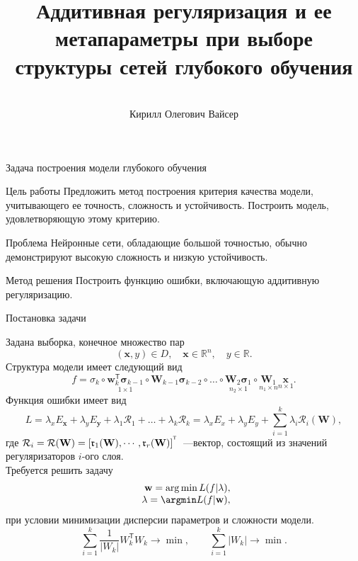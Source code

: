 \documentclass[9pt,pdf,hyperref={unicode}]{beamer}
\title[\hbox to 56mm{Аддитивная регуляризация  \hfill\insertframenumber\,/\,\inserttotalframenumber}]
{Аддитивная регуляризация и ее метапараметры при выборе структуры сетей глубокого обучения}
\author[К.\,О. Вайсер ]{\large \\Кирилл Олегович Вайсер}
\institute{\large
Московский физико-технический институт}
\date{\footnotesize{\emph{Курс:} Численные методы обучения по прецедентам\par (практика, В.\,В. Стрижов)/Группа 774, весна 2020}\\\footnotesize{\emph{Консультант:} аспирант М.\ С. Потанин}\\
\footnotesize{\emph{Научный руководитель:} д.ф.-м.н. В.\ В. Стрижов}}
\newcommand{\rk}{\mathfrak{r}}
\newcommand{\sigmab}{{\boldsymbol{\sigma}}}
\newcommand{\T}{^{\text{\tiny\sffamily\upshape\mdseries T}}}
\newcommand{\x}{{\mathbf{x}}}
\newcommand{\y}{{\mathbf{y}}}
\newcommand{\w}{{\mathbf{W}}}
\newcommand{\wm}{{\mathbf{w}}}
\begin{document}
\begin{frame}
\titlepage
\end{frame}
\begin{frame}{Задача построения модели глубокого обучения}
\begin{block}{Цель работы}
Предложить метод построения критерия качества модели, учитывающего ее точность, сложность и устойчивость. Построить модель, удовлетворяющую этому критерию. 
\end{block}
\begin{block}{Проблема}
Нейронные сети, обладающие большой точностью, обычно демонстрируют высокую сложность и низкую устойчивость.
\end{block}
\begin{block}{Метод решения}
Построить функцию ошибки, включающую аддитивную регуляризацию.
\end{block}
\end{frame}
\begin{frame}{Постановка задачи}

Задана выборка, конечное множество пар  $$
(\mathbf{x},y) \in D,\quad \mathbf{x} \in \mathbb{R}^{n},\quad y\in \mathbb{R}.
$$
Структура модели имеет следующий вид
\begin{equation}
f = \sigma_k\circ\underset{1\times1}{\wm_k^\mathsf{T}\sigmab_{k-1}}\circ\w_{k-1}\sigmab_{k-2}\circ\dots\circ\underset{n_2 \times 1}{\w_2\sigmab_1}\circ\underset{n_1 \times n}{\w_1}\underset{n \times 1}{\x}.
\end{equation}
Функция ошибки имеет вид
\begin{equation}
L = \lambda_xE_{\mathbf{x}} + \lambda_yE_{\y} + \lambda_1\mathcal{R}_1+\dots+\lambda_k\mathcal{R}_k = \lambda_xE_x + \lambda_yE_y + \sum\limits_{i = 1}^k\mathbb{\lambda}_i \mathcal{R}_i(\mathbf{W}),
\end{equation}
где $\mathcal{R}_i = \mathcal{R}(\mathbf{W}) = [\rk_1(\mathbf{W}), \cdots , \rk_r(\mathbf{W})]^{\T}$~---вектор, состоящий из значений регуляризаторов $i$-ого слоя.
\\ Требуется решить задачу
\begin{equation}\label{eq:criterion_argmin}
\begin{array}{r@{}l}
\wm= \arg \min L(f| \mathbf{\lambda}),\\
\mathbf{\lambda }= \argmin L(f| \wm), \\
\end{array}
\end{equation}
при условии минимизации дисперсии параметров и сложности модели.
\begin{equation}
    \sum\limits_{i=1}^k \frac{1}{|W_k|}W_k^\mathsf{T}W_k \rightarrow \min, \quad \quad
    \sum\limits_{i=1}^k |W_k| \rightarrow \min.
\end{equation}
\end{frame}
\end{document}
